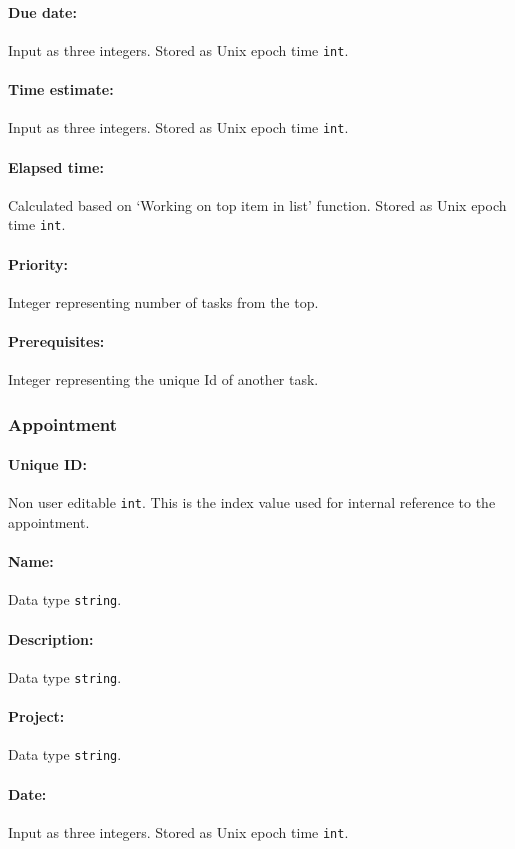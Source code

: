 \documentclass[12pt]{article}
\newcommand{\e}[1] {{\tt #1}}
\begin{document}
\paragraph{Due date:} Input as three integers. Stored as Unix epoch time \e{int}.
\paragraph{Time estimate:} Input as three integers. Stored as Unix epoch time \e{int}.
\paragraph{Elapsed time:} Calculated based on `Working on top item in list' function. Stored as Unix epoch time \e{int}. 
\paragraph{Priority:} Integer representing number of tasks from the top.
\paragraph{Prerequisites:} Integer representing the unique Id of another task.

\subsubsection{Appointment} \label{sec:Appointment}
\paragraph{Unique ID:} Non user editable \e{int}. This is the index value used for internal reference to the appointment. 
\paragraph{Name:} Data type \e{string}.
\paragraph{Description:} Data type \e{string}.
\paragraph{Project:} Data type \e{string}.
\paragraph{Date:} Input as three integers. Stored as Unix epoch time \e{int}.
\end{document}
